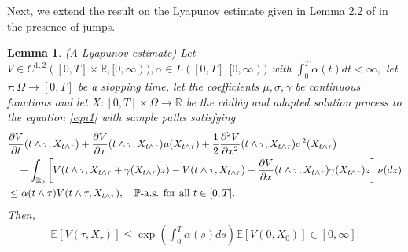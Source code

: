 \documentclass[11pt]{article}
\theoremstyle{theorem}
\newtheorem{Lem}[Def]{Lemma}
\theoremstyle{definition}
\newcommand{\bR}{\mathbb{R}}
\newcommand{\1}{{\bf 1}}
\begin{document}
Next, we extend the result on the Lyapunov estimate given in Lemma 2.2 of \cite{CHJ22} in the presence of jumps.
\begin{Lem} (A Lyapunov estimate) \label{Lem2.2}
 Let $V\in C^{1,2}([0, T]\times \mathbb{R}, [0, \infty)), \alpha \in L([0, T], [0, \infty))$ with $\int_0^T \alpha (t) dt<\infty,$ let $\tau: \Omega\to [0, T]$ be a stopping time, let the coefficients $\mu, \sigma, \gamma$ be continuous functions and let $X: [0, T] \times \Omega \to \mathbb{R}$ be the c\`adl\`ag and adapted  solution process to the equation \eqref{eqn1} with sample paths satisfying
\begin{align}
    \label{ConLem2.3}
        & \dfrac{\partial V}{\partial t} (t \land \tau, X_{t \land \tau}) + \dfrac{\partial V}{\partial x} (t \land \tau, X_{t \land \tau}) \mu (X_{t \land \tau})+ \dfrac{1}{2} \dfrac{\partial^2 V}{\partial x^2}(t \land \tau, X_{t \land \tau}) \sigma^2 (X_{t \land \tau}) \notag \\
        & \quad + \int_{\bR_0} \left[ V(t \land \tau, X_{t \land \tau} + \gamma (X_{t \land \tau})z ) - V(t \land \tau, X_{t \land \tau}) - \dfrac{\partial V}{\partial x}(t \land \tau, X_{t \land \tau}) \gamma (X_{t\land \tau}) z \right] \nu (dz) \notag \\
        & \leq \alpha (t \land \tau) V(t \land \tau, X_{t \land \tau}), \quad \mathbb{P} \text{-a.s. for all } t \in [0,T].
    \end{align}
    Then,
\begin{align*}
    \mathbb{E}\left[V(\tau, X_{\tau})\right] \leq \exp \left( \int_0^T \alpha(s) ds \right) \mathbb{E} [V(0, X_0)] \in [0,\infty].
\end{align*}
\end{Lem}
\end{document}
